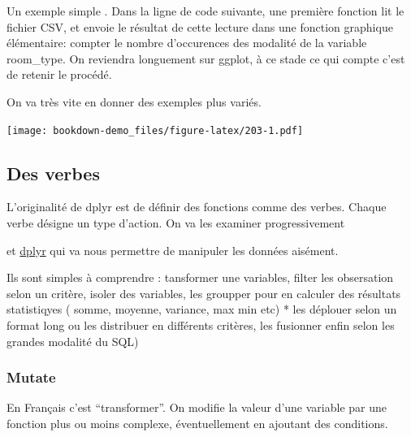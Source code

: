 \documentclass[
]{book}
\newenvironment{Shaded}{\begin{snugshade}}{\end{snugshade}}
\newcommand{\DataTypeTok}[1]{\textcolor[rgb]{0.13,0.29,0.53}{#1}}
\newcommand{\KeywordTok}[1]{\textcolor[rgb]{0.13,0.29,0.53}{\textbf{#1}}}
\newcommand{\NormalTok}[1]{#1}
\newcommand{\OperatorTok}[1]{\textcolor[rgb]{0.81,0.36,0.00}{\textbf{#1}}}
\newcommand{\StringTok}[1]{\textcolor[rgb]{0.31,0.60,0.02}{#1}}
\begin{document}
Un exemple simple . Dans la ligne de code suivante, une première fonction lit le fichier CSV, et envoie le résultat de cette lecture dans une fonction graphique élémentaire: compter le nombre d'occurences des modalité de la variable room\_type. On reviendra longuement sur ggplot, à ce stade ce qui compte c'est de retenir le procédé.

On va très vite en donner des exemples plus variés.

\begin{Shaded}
\end{Shaded}

\texttt{[image: bookdown-demo\_files/figure-latex/203-1.pdf]}

\hypertarget{des-verbes}{%
\subsection{Des verbes}\label{des-verbes}}

L'originalité de dplyr est de définir des fonctions comme des verbes. Chaque verbe désigne un type d'action. On va les examiner progressivement

et \href{http://larmarange.github.io/analyse-R/manipuler-les-donnees-avec-dplyr.html}{dplyr} qui va nous permettre de manipuler les données aisément.

Ils sont simples à comprendre : tansformer une variables, filter les obsersation selon un critère, isoler des variables, les groupper pour en calculer des résultats statistiqyes ( somme, moyenne, variance, max min etc) * les déplouer selon un format long ou les distribuer en différents critères, les fusionner enfin selon les grandes modalité du SQL)

\hypertarget{mutate}{%
\subsubsection{Mutate}\label{mutate}}

En Français c'est ``transformer''. On modifie la valeur d'une variable par une fonction plus ou moins complexe, éventuellement en ajoutant des conditions.
\end{document}
